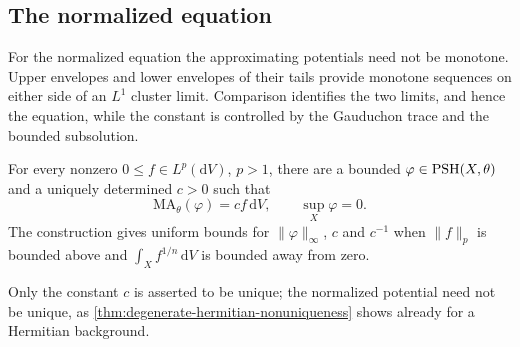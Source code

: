 \subsection{The normalized equation}

For the normalized equation the approximating potentials need not be monotone. Upper envelopes and lower envelopes of their tails provide monotone sequences on either side of an $L^1$ cluster limit. Comparison identifies the two limits, and hence the equation, while the constant is controlled by the Gauduchon trace and the bounded subsolution.

\begin{theorem}\label{thm:big-bounded-normalized}
For every nonzero $0\leq f\in L^p(\mathrm{d}V)$, $p>1$, there are a bounded $\varphi\in\mathrm{PSH}(X,\theta)$ and a uniquely determined $c>0$ such that
\[
 \mathrm{MA}_\theta(\varphi)=cf\,\mathrm{d}V,\qquad \sup_X\varphi=0.
\]
The construction gives uniform bounds for $\|\varphi\|_\infty$, $c$ and $c^{-1}$ when $\|f\|_p$ is bounded above and $\int_Xf^{1/n}\,\mathrm{d}V$ is bounded away from zero.
\end{theorem}

Only the constant $c$ is asserted to be unique; the normalized potential need not be unique, as \cref{thm:degenerate-hermitian-nonuniqueness} shows already for a Hermitian background.

